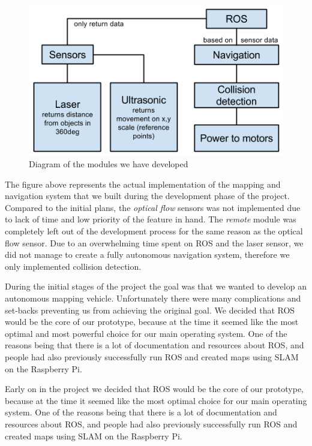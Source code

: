 \begin{figure}[H]
	\centering
	\includegraphics[scale=.7]{images/developmentdiagram2.png}
	\caption{Diagram of the modules we have developed}
	\label{fig:developmentdiagram2}
\end{figure}

The figure above represents the actual implementation of the mapping and navigation system that we built during the development phase of the project. Compared to the initial plans, the \textit{optical flow} sensors was not implemented due to lack of time and low priority of the feature in hand. The \textit{remote} module was completely left out of the development process for the same reason as the optical flow sensor. Due to an overwhelming time spent on ROS and the laser sensor, we did not manage to create a fully autonomous navigation system, therefore we only implemented collision detection.

During the initial stages of the project the goal was that we wanted to develop an autonomous mapping vehicle. Unfortunately there were many complications and set-backs preventing us from achieving the original goal. We decided that ROS would be the core of our prototype, because at the time it seemed like the most optimal and most powerful choice for our main operating system. One of the reasons being that there is a lot of documentation and resources about ROS, and people had also previously successfully run ROS and created maps using SLAM on the Raspberry Pi.\cite{pibot}\cite{pibotbook}

Early on in the project we decided that ROS would be the core of our prototype, because at the time it seemed like the most optimal choice for our main operating system. One of the reasons being that there is a lot of documentation and resources about ROS, and people had also previously successfully run ROS and created maps using SLAM on the Raspberry Pi.

